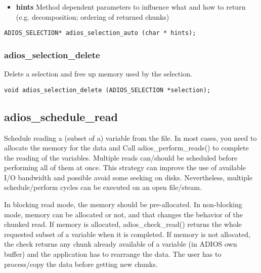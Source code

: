\begin{itemize} 
\item{\bf hints}    Method dependent parameters to influence what and how to 
 return (e.g. decomposition; ordering of returned chunks)
\end{itemize} 

\begin{lstlisting}[alsolanguage=C]
ADIOS_SELECTION* adios_selection_auto (char * hints);
\end{lstlisting}


\subsubsection{adios\_selection\_delete}
Delete a selection and free up memory used by the selection.

\begin{lstlisting}[alsolanguage=C]
void adios_selection_delete (ADIOS_SELECTION *selection);
\end{lstlisting}




\subsection{adios\_schedule\_read}
Schedule reading a (subset of a) variable from the file.
In most cases, you need to allocate the memory for the data and 
Call adios\_perform\_reads() to 
complete the reading of the variables. Multiple reads can/should be scheduled before performing 
all of them at once. This strategy can improve the use of available I/O bandwidth and possible avoid
some seeking on disks. Nevertheless, multiple schedule/perform cycles can be executed on an 
open file/steam.

In blocking read mode, the memory should be pre-allocated. 
In non-blocking mode, memory can be allocated or not, and that changes the behavior of the chunked read. 
If memory is allocated, adios\_check\_read() returns the whole requested subset of a variable when it is completed.
If memory is not allocated, the check returns any chunk already available of a variable (in ADIOS own buffer)
and the application has to rearrange the data. The user has to process/copy the data before getting new chunks.

